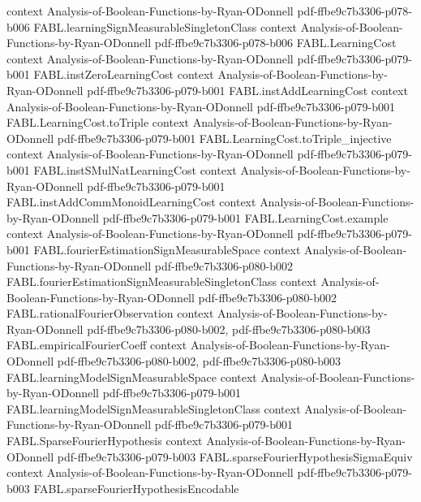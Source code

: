 \begin{theorem}
  {context}
  {Analysis-of-Boolean-Functions-by-Ryan-ODonnell}
  {pdf-ffbe9c7b3306-p078-b006}
\proofstep
  {FABL.learningSignMeasurableSingletonClass}
  {context}
  {Analysis-of-Boolean-Functions-by-Ryan-ODonnell}
  {pdf-ffbe9c7b3306-p078-b006}
\proofstep
  {FABL.LearningCost}
  {context}
  {Analysis-of-Boolean-Functions-by-Ryan-ODonnell}
  {pdf-ffbe9c7b3306-p079-b001}
\proofstep
  {FABL.instZeroLearningCost}
  {context}
  {Analysis-of-Boolean-Functions-by-Ryan-ODonnell}
  {pdf-ffbe9c7b3306-p079-b001}
\proofstep
  {FABL.instAddLearningCost}
  {context}
  {Analysis-of-Boolean-Functions-by-Ryan-ODonnell}
  {pdf-ffbe9c7b3306-p079-b001}
\proofstep
  {FABL.LearningCost.toTriple}
  {context}
  {Analysis-of-Boolean-Functions-by-Ryan-ODonnell}
  {pdf-ffbe9c7b3306-p079-b001}
\proofstep
  {FABL.LearningCost.toTriple_injective}
  {context}
  {Analysis-of-Boolean-Functions-by-Ryan-ODonnell}
  {pdf-ffbe9c7b3306-p079-b001}
\proofstep
  {FABL.instSMulNatLearningCost}
  {context}
  {Analysis-of-Boolean-Functions-by-Ryan-ODonnell}
  {pdf-ffbe9c7b3306-p079-b001}
\proofstep
  {FABL.instAddCommMonoidLearningCost}
  {context}
  {Analysis-of-Boolean-Functions-by-Ryan-ODonnell}
  {pdf-ffbe9c7b3306-p079-b001}
\proofstep
  {FABL.LearningCost.example}
  {context}
  {Analysis-of-Boolean-Functions-by-Ryan-ODonnell}
  {pdf-ffbe9c7b3306-p079-b001}
\proofstep
  {FABL.fourierEstimationSignMeasurableSpace}
  {context}
  {Analysis-of-Boolean-Functions-by-Ryan-ODonnell}
  {pdf-ffbe9c7b3306-p080-b002}
\proofstep
  {FABL.fourierEstimationSignMeasurableSingletonClass}
  {context}
  {Analysis-of-Boolean-Functions-by-Ryan-ODonnell}
  {pdf-ffbe9c7b3306-p080-b002}
\proofstep
  {FABL.rationalFourierObservation}
  {context}
  {Analysis-of-Boolean-Functions-by-Ryan-ODonnell}
  {pdf-ffbe9c7b3306-p080-b002,
    pdf-ffbe9c7b3306-p080-b003}
\proofstep
  {FABL.empiricalFourierCoeff}
  {context}
  {Analysis-of-Boolean-Functions-by-Ryan-ODonnell}
  {pdf-ffbe9c7b3306-p080-b002,
    pdf-ffbe9c7b3306-p080-b003}
\proofstep
  {FABL.learningModelSignMeasurableSpace}
  {context}
  {Analysis-of-Boolean-Functions-by-Ryan-ODonnell}
  {pdf-ffbe9c7b3306-p079-b001}
\proofstep
  {FABL.learningModelSignMeasurableSingletonClass}
  {context}
  {Analysis-of-Boolean-Functions-by-Ryan-ODonnell}
  {pdf-ffbe9c7b3306-p079-b001}
\proofstep
  {FABL.SparseFourierHypothesis}
  {context}
  {Analysis-of-Boolean-Functions-by-Ryan-ODonnell}
  {pdf-ffbe9c7b3306-p079-b003}
\proofstep
  {FABL.sparseFourierHypothesisSigmaEquiv}
  {context}
  {Analysis-of-Boolean-Functions-by-Ryan-ODonnell}
  {pdf-ffbe9c7b3306-p079-b003}
\proofstep
  {FABL.sparseFourierHypothesisEncodable}

\end{theorem}
